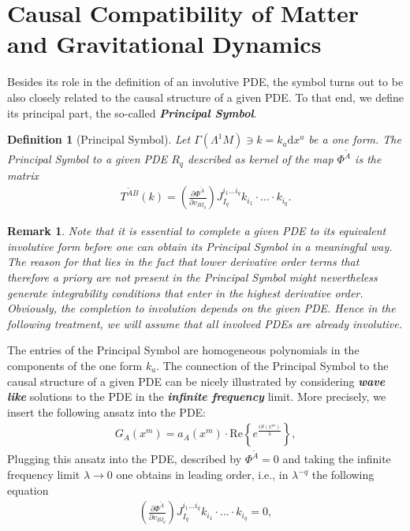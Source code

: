 \documentclass[a4paper,12pt, DIV=14, BCOR=5mm, twoside, headsepline, numbers=noenddot]{scrbook}
\newtheorem{definition}{Definition}[section]
\newtheorem*{remark}{Remark}
\begin{document}
\section{Causal Compatibility of Matter and Gravitational Dynamics}
Besides its role in the definition of an involutive PDE, the symbol turns out to be also closely related to the causal structure of a given PDE. To that end, we define its principal part, the so-called \textbf{\textit{Principal Symbol}}.
\begin{definition}[Principal Symbol] \label{PSym}
Let $\Gamma(\Lambda^1M) \ni k = k_{a} \mathrm{d}x^a$ be a one form. The Principal Symbol to a given PDE $R_q$ described as kernel of the map $\Phi^{\tilde{A}}$ is the matrix
\begin{align}
    T^{\tilde{A} B}(k) = \left ( \frac{\partial \Phi^{\tilde{A}}}{\partial v_{BI_q}} \right ) J_{I_q}^{i_1...i_q} k_{i_1} \cdot ... \cdot k_{i_q}.
\end{align}
\end{definition}
\begin{remark}
Note that it is essential to complete a given PDE to its equivalent involutive form before one can obtain its Principal Symbol in a meaningful way. The reason for that lies in the fact that lower derivative order terms that therefore a priory are not present in the Principal Symbol might nevertheless generate integrability conditions that enter in the highest derivative order. Obviously, the completion to involution depends on the given PDE. Hence in the following treatment, we will assume that all involved PDEs are already involutive.
\end{remark}
The entries of the Principal Symbol are homogeneous polynomials in the components of the one form $k_a$.
The connection of the Principal Symbol to the causal structure of a given PDE can be nicely illustrated by considering \textit{\textbf{wave like}} solutions to the PDE in the \textit{\textbf{infinite frequency}} limit. 
More precisely, we insert the following ansatz into the PDE:
\begin{align}\label{waveAns}
    G_A(x^m) = a_A(x^m) \cdot \mathrm{Re}\left \{ e^{\frac{iS(x^m)}{\lambda}} \right \},
\end{align}
Plugging this ansatz into the PDE, described by $\Phi^{\tilde{A}}=0$ and taking the infinite frequency limit $\lambda \rightarrow 0$ one obtains in leading order, i.e., in $\lambda^{-q}$ the following equation
\begin{align}
    \left ( \frac{\partial \Phi^{\tilde{A}}}{\partial v_{BI_q}} \right ) J_{I_q}^{i_1...i_q} k_{i_1} \cdot ... \cdot k_{i_q} = 0,
\end{align}
\end{document}

